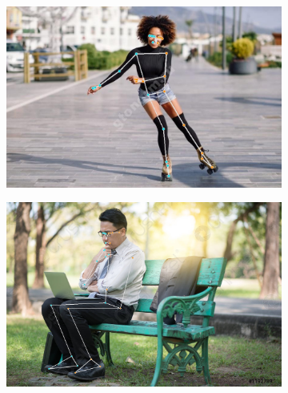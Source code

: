 \begin{figure}[h]
\begin{subfigure}[b]{.5\textwidth}
	\centering
	\includegraphics[width=\textwidth]{./images/MPPose/19}
	\caption{ }
\end{subfigure}
\begin{subfigure}[b]{.5\textwidth}
	\centering
    \includegraphics[width=\textwidth]{./images/MPPose/23}
    \caption{ }
\end{subfigure}
\begin{subfigure}[b]{.5\textwidth}
	\centering

\end{subfigure}
\end{figure}
